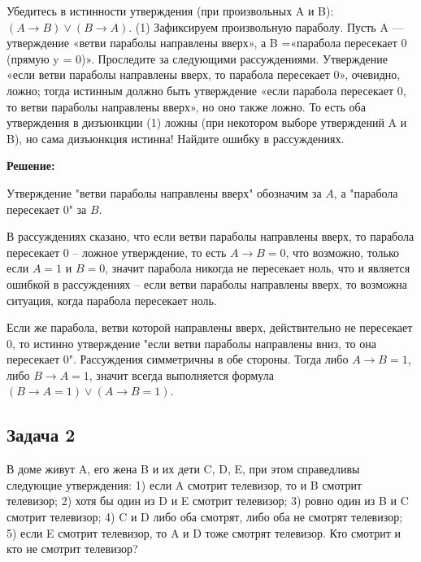 \documentclass[a4paper,14pt]{article} %
\begin{document}
Убедитесь в истинности утверждения (при произвольных A и B):
$(A \rightarrow B) \vee (B \rightarrow A).$ (1)
Зафиксируем произвольную параболу. Пусть A — утверждение «ветви
параболы направлены вверх», а B =«парабола пересекает 0 (прямую
y = 0)». Проследите за следующими рассуждениями. Утверждение
«если ветви параболы направлены вверх, то парабола пересекает 0»,
очевидно, ложно; тогда истинным должно быть утверждение «если
парабола пересекает 0, то ветви параболы направлены вверх», но оно
также ложно. То есть оба утверждения в дизъюнкции (1) ложны (при
некотором выборе утверждений A и B), но сама дизъюнкция истинна!
Найдите ошибку в рассуждениях.



\begin{center}
\bfseries
{\Large Решение: }
\end{center}


Утверждение "ветви параболы направлены вверх"\hspace{1pt} обозначим за $A$, а "парабола пересекает 0"\hspace{1pt} за $B$.

В рассуждениях сказано, что если ветви параболы направлены вверх, то парабола пересекает 0 -- ложное утверждение, то есть $A\rightarrow B = 0$, что возможно, только если $A = 1$ и $B = 0$, значит парабола никогда не пересекает ноль, что и является ошибкой в рассуждениях -- если ветви параболы направлены вверх, то возможна ситуация, когда парабола пересекает ноль.

Если же парабола, ветви которой направлены вверх, действительно не пересекает 0, то истинно утверждение "если ветви параболы направлены вниз, то она пересекает 0". Рассуждения симметричны в обе стороны. Тогда либо $A\rightarrow B = 1$, либо $B\rightarrow A = 1$, значит всегда выполняется формула
$(B\rightarrow A = 1) \vee (A\rightarrow B = 1)$.

\newpage
\begin{center}
\subsection{Задача 2}
\end{center}

В доме живут A, его жена B и их дети C, D, E, при этом справедливы
следующие утверждения:
1) если A смотрит телевизор, то и B смотрит телевизор;
2) хотя бы один из D и E смотрит телевизор;
3) ровно один из B и C смотрит телевизор;
4) C и D либо оба смотрят, либо оба не смотрят телевизор;
5) если E смотрит телевизор, то A и D тоже смотрят телевизор.
Кто смотрит и кто не смотрит телевизор?
\end{document}
